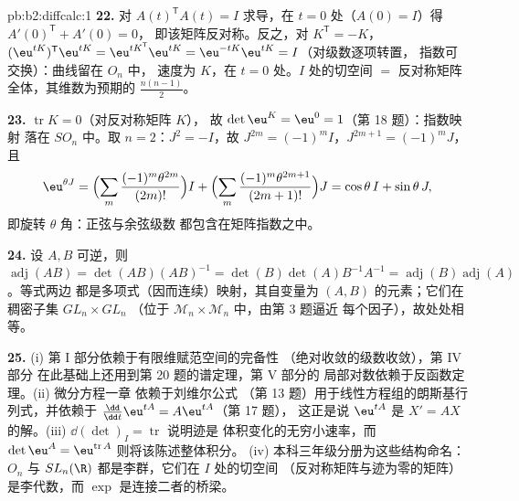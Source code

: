 \begin{solution}{pb:b2:diffcalc:1}
\textbf{22.} 对 $A(t)^{\mathsf T}A(t) = I$ 求导，在 $t
= 0$ 处（$A(0) = I$）得 $A'(0)^{\mathsf T} + A'(0) = 0$，
即该矩阵反对称。反之，对 $K^{\mathsf T} = -K$，
$(\eu^{tK})^{\mathsf T}\eu^{tK} = \eu^{tK^{\mathsf T}}
\eu^{tK} = \eu^{-tK}\eu^{tK} = I$（对级数逐项转置，
指数可交换）：曲线留在 $O_n$ 中，
速度为 $K$，在 $t = 0$ 处。$I$ 处的切空间 $=$
反对称矩阵全体，其维数为预期的
$\frac{n(n-1)}2$。

\textbf{23.} $\operatorname{tr}K = 0$（对反对称矩阵 $K$），
故 $\det\eu^K = \eu^0 = 1$（第 18 题）：指数映射
落在 $SO_n$ 中。取 $n = 2$：$J^2 = -I$，故 $J^{2m} =
(-1)^mI$，$J^{2m+1} = (-1)^mJ$，且
\[
\eu^{\theta J}
= \Bigl(\sum_m\frac{(-1)^m\theta^{2m}}{(2m)!}\Bigr)I
+ \Bigl(\sum_m\frac{(-1)^m\theta^{2m+1}}{(2m+1)!}\Bigr)J
= \cos\theta\,I + \sin\theta\,J ,
\]
即旋转 $\theta$ 角：正弦与余弦级数
都包含在矩阵指数之中。

\textbf{24.} 设 $A, B$ 可逆，则 $\operatorname{adj}(AB) =
\det(AB)(AB)^{-1} = \det(B)\det(A)B^{-1}A^{-1} =
\operatorname{adj}(B)\operatorname{adj}(A)$。等式两边
都是多项式（因而连续）映射，其自变量为
$(A, B)$ 的元素；它们在稠密子集 $GL_n\times GL_n$
（位于 $\mathcal M_n\times\mathcal M_n$ 中，由第 3 题逼近
每个因子），故处处相等。

\textbf{25.} (i) 第 I 部分依赖于有限维赋范空间的完备性
（绝对收敛的级数收敛），第 IV 部分
在此基础上还用到第 20 题的谱定理，第 V 部分的
局部对数依赖于反函数定理。(ii) 微分方程一章
依赖于刘维尔公式
（第 13 题）用于线性方程组的朗斯基行列式，并依赖于
$\frac{\dd}{\dd t}\eu^{tA} = A\eu^{tA}$（第 17 题），
这正是说 $\eu^{tA}$ 是 $X' = AX$ 的解。(iii)
$\dd(\det)_I = \operatorname{tr}$ 说明迹是
体积变化的无穷小速率，而 $\det\eu^A =
\eu^{\operatorname{tr}A}$ 则将该陈述整体积分。
(iv) 本科三年级分册为这些结构命名：$O_n$ 与
$SL_n(\R)$ 都是李群，它们在 $I$ 处的切空间
（反对称矩阵与迹为零的矩阵）是李代数，而
$\exp$ 是连接二者的桥梁。
\end{solution}
